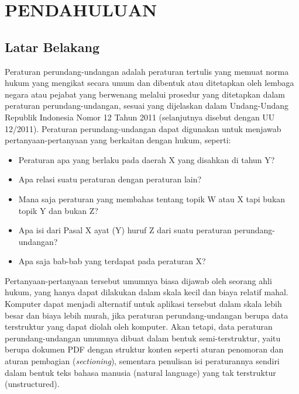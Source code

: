 \chapter{PENDAHULUAN}\label{bab:1}

\section{Latar Belakang}\label{sec:latar-belakang}

Peraturan perundang-undangan adalah peraturan tertulis yang memuat norma hukum yang mengikat secara
umum dan dibentuk atau ditetapkan oleh lembaga negara atau pejabat yang berwenang melalui prosedur
yang ditetapkan dalam peraturan perundang-undangan, sesuai yang dijelaskan dalam Undang-Undang
Republik Indonesia Nomor 12 Tahun 2011 (selanjutnya disebut dengan UU 12/2011). Peraturan
perundang-undangan dapat digunakan untuk menjawab pertanyaan-pertanyaan yang berkaitan dengan hukum,
seperti:

\begin{itemize}
  \item Peraturan apa yang berlaku pada daerah X yang disahkan di tahun Y?
  \item Apa relasi suatu peraturan dengan peraturan lain?
  \item Mana saja peraturan yang membahas tentang topik W atau X tapi bukan topik Y dan bukan Z?
  \item Apa isi dari Pasal X ayat (Y) huruf Z dari suatu peraturan perundang-undangan?
  \item Apa saja bab-bab yang terdapat pada peraturan X?
\end{itemize}

Pertanyaan-pertanyaan tersebut umumnya biasa dijawab oleh seorang ahli hukum, yang hanya dapat
dilakukan dalam skala kecil dan biaya relatif mahal. Komputer dapat menjadi alternatif untuk
aplikasi tersebut dalam skala lebih besar dan biaya lebih murah, jika peraturan perundang-undangan
berupa data terstruktur yang dapat diolah oleh komputer. Akan tetapi, data peraturan
perundang-undangan umumnya dibuat dalam bentuk semi-terstruktur, yaitu berupa dokumen PDF dengan
struktur konten seperti aturan penomoran dan aturan pembagian (\textit{sectioning}), sementara
penulisan isi peraturannya sendiri dalam bentuk teks bahasa manusia (natural language) yang tak
terstruktur (unstructured).

